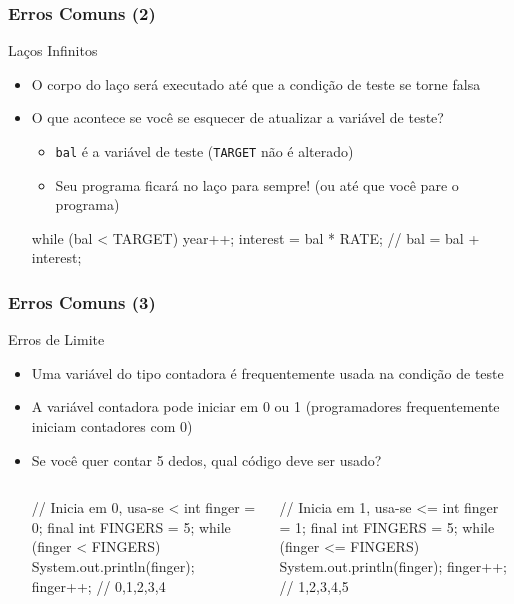 \documentclass[xcolor={dvipsnames,table},aspectratio=169]{beamer}
\begin{document}
\begin{frame}[fragile]\frametitle{Erros Comuns (2)}
Laços Infinitos
\begin{itemize}
	\item O corpo do laço será executado até que a condição de teste se torne falsa
	\item O que acontece se você se esquecer de atualizar a variável de teste?
	\begin{itemize}
		\item \texttt{bal} é a variável de teste (\texttt{TARGET} não é alterado)
		\item Seu programa ficará no laço para sempre! (ou até que você pare o programa)
	\end{itemize}
\begin{javacode}
while (bal < TARGET) {
   year++;
   interest = bal * RATE;
   // bal = bal + interest;
}
\end{javacode}
\end{itemize}
\end{frame}

\begin{frame}[fragile]\frametitle{Erros Comuns (3)}
Erros de Limite
\begin{itemize}
	\item Uma variável do tipo contadora é frequentemente usada na condição de teste
	\item A variável contadora pode iniciar em 0 ou 1 (programadores frequentemente iniciam contadores com 0)
	\item Se você quer contar 5 dedos, qual código deve ser usado?
\begin{columns}[T]
	\begin{column}{0.5\linewidth}
\begin{javacode}
// Inicia em 0, usa-se <
int finger = 0;
final int FINGERS = 5;
while (finger < FINGERS) {
   System.out.println(finger);
   finger++;
}
// 0,1,2,3,4
\end{javacode}
	\end{column}
	\begin{column}{0.5\linewidth}
\begin{javacode}
// Inicia em 1, usa-se <=
int finger = 1;
final int FINGERS = 5;
while (finger <= FINGERS) {
   System.out.println(finger);
   finger++;
}
// 1,2,3,4,5
\end{javacode}
	\end{column}
\end{columns}
\end{itemize}
\end{frame}
\end{document}
